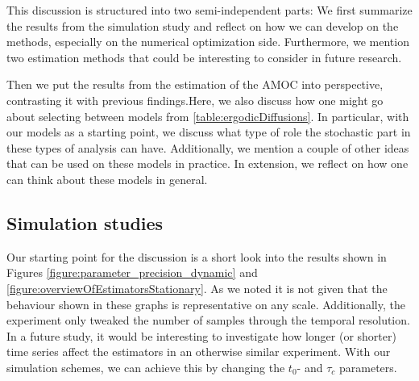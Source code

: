 This discussion is structured into two semi-independent parts: We first summarize the results from the simulation study and reflect on how we can develop on the methods, especially on the numerical optimization side. Furthermore, we mention two estimation methods that could be interesting to consider in future research.

Then we put the results from the estimation of the AMOC into perspective, contrasting it with previous findings.Here, we also discuss how one might go about selecting between models from \ref{table:ergodicDiffusions}. In particular, with our models as a starting point, we discuss what type of role the stochastic part in these types of analysis can have. Additionally, we mention a couple of other ideas that can be used on these models in practice. In extension, we reflect on how one can think about these models in general.
\subsection{Simulation studies}
Our starting point for the discussion is a short look into the results shown in Figures \ref{figure:parameter_precision_dynamic} and \ref{figure:overviewOfEstimatorsStationary}. As we noted it is not given that the behaviour shown in these graphs is representative on any scale. Additionally, the experiment only tweaked the number of samples through the temporal resolution. In a future study, it would be interesting to investigate how longer (or shorter) time series affect the estimators in an otherwise similar experiment. With our simulation schemes, we can achieve this by changing the $t_0$- and $\tau_c$ parameters.

